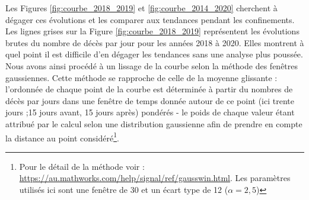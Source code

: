 \documentclass[titlepage]{article}
\begin{document}

Les Figures \ref{fig:courbe_2018_2019} et \ref{fig:courbe_2014_2020} cherchent à dégager ces évolutions et les comparer aux tendances pendant les confinements. Les lignes grises sur la Figure \ref{fig:courbe_2018_2019} représentent les évolutions brutes du nombre de décès par jour pour les années 2018 à 2020. Elles montrent à quel point il est difficile d'en dégager les tendances sans une analyse plus poussée. Nous avons ainsi procédé à un lissage de la courbe selon la méthode des fenêtres gaussiennes. Cette méthode se rapproche de celle de la moyenne glissante : l'ordonnée de chaque point de la courbe est déterminée à partir du nombres de décès par jours dans une fenêtre de temps donnée autour de ce point (ici trente jours ;15 jours avant, 15 jours après) pondérés - le poids de chaque valeur étant attribué par le calcul selon une distribution gaussienne afin de prendre en compte la distance au point considéré\footnote{Pour le détail de la méthode voir : \url{https://au.mathworks.com/help/signal/ref/gausswin.html}. Les paramètres utilisés ici sont une fenêtre de 30 et un écart type de 12 ($\alpha = 2,5$)}. \\
\end{document}
